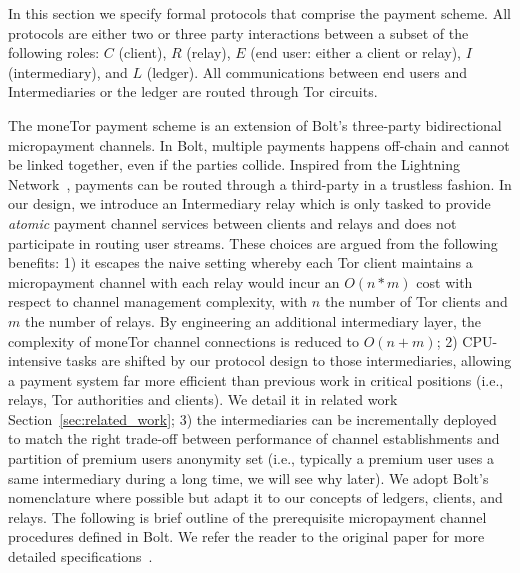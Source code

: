 In this section we specify formal protocols that comprise the payment scheme.
All protocols are either two or three party interactions between a subset of the
following roles: $C$ (client), $R$ (relay), $E$ (end user: either a client or
relay), $I$ (intermediary), and $L$ (ledger). All communications between end
users and Intermediaries or the ledger are routed through Tor circuits.

The moneTor payment scheme is an extension of Bolt's three-party bidirectional
micropayment channels. In Bolt, multiple payments happens off-chain and cannot
be linked together, even if the parties collide. Inspired from the Lightning
Network~\cite{poon2016bitcoin}, payments can be routed through a third-party in
a trustless fashion. In our design, we introduce an Intermediary relay which is
only tasked to provide \emph{atomic} payment channel services between clients
and relays and does not participate in routing user streams. These choices are
argued from the following benefits: 1) it escapes the naive setting whereby each
Tor client maintains a micropayment channel with each relay would incur an
$O(n*m)$ cost with respect to channel management complexity, with $n$ the number
of Tor clients and $m$ the number of relays. By engineering an additional
intermediary layer, the complexity of moneTor channel connections is reduced to
$O(n+m)$; 2) CPU-intensive tasks are shifted by our protocol design to those
intermediaries, allowing a payment system far more efficient than previous work
in critical positions (i.e., relays, Tor authorities and clients). We detail it
in related work Section~\ref{sec:related_work}; 3) the intermediaries can be
incrementally deployed to match the right trade-off between performance of
channel establishments and partition of premium users anonymity set (i.e.,
typically a premium user uses a same intermediary during a long time, we will
see why later). We adopt Bolt's nomenclature where possible but adapt it to our
concepts of ledgers, clients, and relays. The following is brief outline of the
prerequisite micropayment channel procedures defined in Bolt. We refer the
reader to the original paper for more detailed
specifications~\cite{green2017bolt}.

